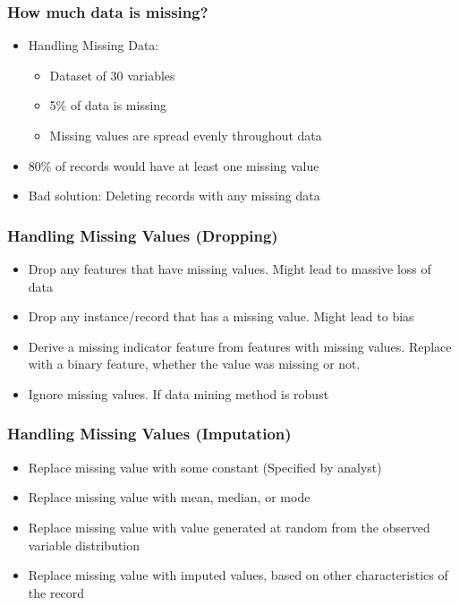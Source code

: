 \begin{frame}[fragile]\frametitle{How much data is missing?}	
\begin{itemize}
\item Handling Missing Data:
	\begin{itemize}
	\item Dataset of 30 variables
	\item 5\% of data is missing
	\item Missing values are spread evenly throughout data
	\end{itemize}
\item 80\% of records would have at least one missing value
\item Bad solution: Deleting records with any missing data
\end{itemize}
\end{frame}

\begin{frame}[fragile]\frametitle{Handling Missing Values (Dropping)}	
\begin{itemize}
\item Drop any features that have missing values. Might lead to massive loss of data
\item Drop any instance/record that has a missing value. Might lead to bias
\item Derive a missing indicator feature from features with missing values. Replace with a binary feature, whether the value was missing or not.
\item Ignore missing values. If data mining method is robust
\end{itemize}
\end{frame}

\begin{frame}[fragile]\frametitle{Handling Missing Values (Imputation)}	
\begin{itemize}
\item Replace missing value with some constant (Specified by analyst)
\item Replace missing value with mean, median, or mode
\item Replace missing value with value generated at random from the observed variable distribution
\item Replace missing value with imputed values, based on other characteristics of the record
\end{itemize}
\end{frame}

